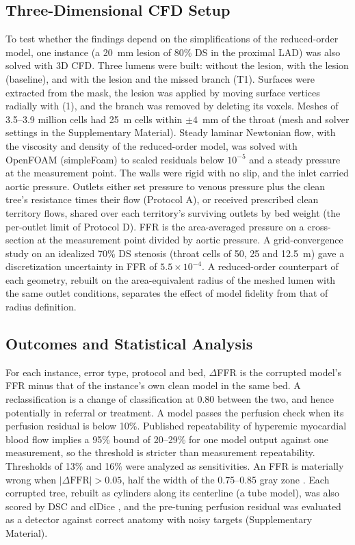 \documentclass[journal,twoside,web]{ieeecolor}
\begin{document}
\subsection{Three-Dimensional CFD Setup}
To test whether the findings depend on the simplifications of the reduced-order model, one instance (a 20~mm lesion
of 80\% DS in the proximal LAD) was also solved with 3D CFD. Three lumens were built: without the lesion, with the lesion (baseline), and with the
lesion and the missed branch (T1). Surfaces were extracted from the mask, the
lesion was applied by moving surface vertices radially with (1), and the branch was removed by deleting its voxels.
Meshes of 3.5--3.9 million cells had 25~\textmu m cells within $\pm 4$~mm of the throat (mesh and solver settings in the Supplementary Material).
Steady laminar Newtonian flow, with the viscosity and density of the reduced-order model, was solved with OpenFOAM
(simpleFoam) to scaled residuals below $10^{-5}$ and a steady pressure at the measurement
point. The walls were rigid with no slip, and the inlet carried aortic pressure. Outlets either set pressure to venous pressure plus the clean tree's resistance times their flow (Protocol A), or received prescribed clean territory flows, shared over each territory's surviving outlets by bed weight (the per-outlet limit of Protocol D). FFR
is the area-averaged pressure on a cross-section at the measurement point divided by aortic pressure. A
grid-convergence study on an idealized 70\% DS stenosis (throat cells of 50, 25 and 12.5~\textmu m) gave a
discretization uncertainty in FFR of $5.5\times10^{-4}$. A reduced-order counterpart of each geometry, rebuilt on the
area-equivalent radius of the meshed lumen with the same outlet conditions, separates the effect of model fidelity
from that of radius definition.

\subsection{Outcomes and Statistical Analysis}
For each instance, error type, protocol and bed, $\Delta$FFR is the corrupted model's FFR minus that of the
instance's own clean model in the same bed. A reclassification is a change of classification at 0.80 between the two, and hence potentially
in referral or treatment. A model passes the perfusion check when its perfusion residual is below 10\%.
Published repeatability of hyperemic myocardial blood flow \cite{schindler2023,brown2018} implies a 95\% bound of
20--29\% for one model output against one measurement, so the threshold is stricter than measurement repeatability. Thresholds of
13\% and 16\% were analyzed as sensitivities. An FFR is materially wrong when $|\Delta\mathrm{FFR}| > 0.05$, half the width of the 0.75--0.85 gray zone
\cite{petraco2013}. Each corrupted tree, rebuilt as cylinders along its centerline (a tube model), was also scored by DSC and clDice \cite{shit2021}, and the
pre-tuning perfusion residual was evaluated as a detector against correct anatomy with noisy targets
(Supplementary Material).
\end{document}
